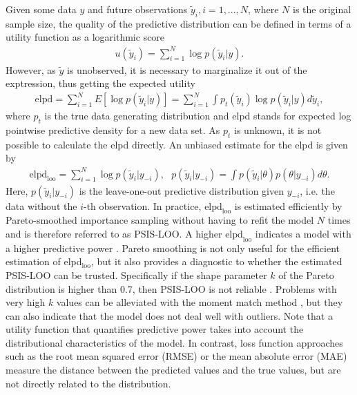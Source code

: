 Given some data $y$ and future observations $\tilde y_i, i = 1, ..., N$, where $N$ is the original sample size, the quality of the predictive distribution can be defined in terms of a utility function as a logarithmic score \citep{piironen_comparison_2017}
\begin{gather*}
    u(\tilde y_i) = \displaystyle \sum_{i = 1}^N\log p(\tilde y_i|y).
\end{gather*}
However, as $\tilde y$ is unobserved, it is necessary to marginalize it out of the exptression, thus getting the expected utility
\begin{gather*}
    \text{elpd} =
    \displaystyle \sum_{i = 1}^N E[\log p(\tilde y_i| y)] =
    \displaystyle \sum_{i = 1}^N \int p_t(\tilde y_i) \log p(\tilde y_i| y) d \tilde y_i,
\end{gather*}
where $p_t$ is the true data generating distribution and elpd stands for expected log pointwise predictive density for a new data set.
As $p_t$ is unknown, it is not possible to calculate the elpd directly.
An unbiased estimate for the elpd is given by
\begin{gather}
    \text{elpd}_{\text{loo}} =
    \displaystyle \sum_{i = 1}^N \log p(\tilde y_i| y_{-i}),
    ~~~ p(\tilde y_i| y_{-i}) = \displaystyle \int p(\tilde y_i | \theta)p(\theta|y_{-i})d\theta.
\end{gather}
Here, $p(\tilde y_i| y_{-i})$ is the leave-one-out predictive distribution given $y_{-i}$, i.e. the data without the $i$-th observation.
In practice, $\text{elpd}_{\text{loo}}$ is estimated efficiently by Pareto-smoothed importance sampling without having to refit the model $N$ times and is therefore referred to as PSIS-LOO.
A higher $\text{elpd}_{\text{loo}}$ indicates a model with a higher predictive power \citep{vehtari_practical_2017}.
Pareto smoothing is not only useful for the efficient estimation of elpd$_{\text{loo}}$, but it also provides a diagnostic to whether the estimated PSIS-LOO can be trusted.
Specifically if the shape parameter $k$ of the Pareto distribution is higher than 0.7, then PSIS-LOO is not reliable \citep{vehtari_practical_2017}.
Problems with very high $k$ values can be alleviated with the moment match method \cite{paananen_implicitly_2021}, but they can also indicate that the model does not deal well with outliers.
Note that a utility function that quantifies predictive power takes into account the distributional characteristics of the model.
In contrast, loss function approaches such as the root mean squared error (RMSE) or the mean absolute error (MAE) measure the distance between the predicted values and the true values, but are not directly related to the distribution.

